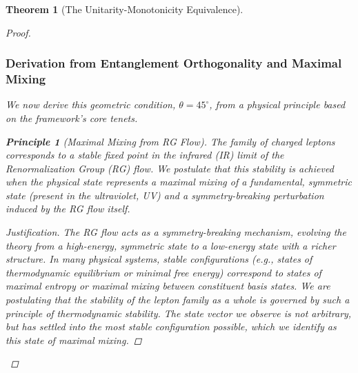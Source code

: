 \documentclass[11pt, letterpaper]{report}
\theoremstyle{plain} %
\newtheorem{theorem}{Theorem}[chapter]
\theoremstyle{definition} %
\newtheorem{principle}{Principle}[chapter]
\theoremstyle{remark} %
\begin{document}
\begin{theorem}[The Unitarity-Monotonicity Equivalence]
\begin{proof}
\subsubsection{Derivation from Entanglement Orthogonality and Maximal Mixing}

We now derive this geometric condition, $\theta=45^\circ$, from a physical principle based on the framework's core tenets.

\begin{principle}[Maximal Mixing from RG Flow]
\label{principle:maximal_mixing}
The family of charged leptons corresponds to a stable fixed point in the infrared (IR) limit of the Renormalization Group (RG) flow. We postulate that this stability is achieved when the physical state represents a maximal mixing of a fundamental, symmetric state (present in the ultraviolet, UV) and a symmetry-breaking perturbation induced by the RG flow itself.
\end{principle}
\begin{proof}[Justification]
The RG flow acts as a symmetry-breaking mechanism, evolving the theory from a high-energy, symmetric state to a low-energy state with a richer structure. In many physical systems, stable configurations (e.g., states of thermodynamic equilibrium or minimal free energy) correspond to states of maximal entropy or maximal mixing between constituent basis states. We are postulating that the stability of the lepton family as a whole is governed by such a principle of thermodynamic stability. The state vector we observe is not arbitrary, but has settled into the most stable configuration possible, which we identify as this state of maximal mixing.


\end{proof}
\end{proof}
\end{theorem}
\end{document}

